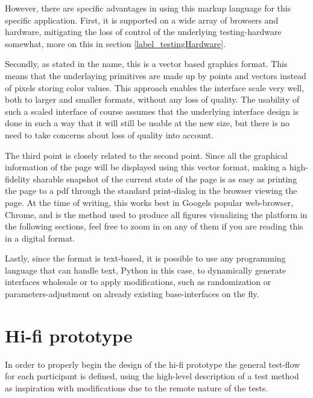 {  However, there are specific advantages in using this markup language for this
  specific application. First, it is supported on a wide array of browsers and
  hardware, mitigating the loss of control of the underlying testing-hardware
  somewhat, more on this in section \ref{label_testingHardware}.

  Secondly, as stated in the name, this is a vector based graphics format.
  This means that the underlaying primitives are made up by  points and vectors
  instead of pixels storing color values. This approach enables the interface
  scale very well, both to larger and smaller formats, without any loss of
  quality. The usability of such a scaled interface of course assumes that the
  underlying interface design is done in such a way that it will still be
  usable at the new size, but there is no need to take concerns about loss of
  quality into account.

  The third point is closely related to the second point. Since all the
  graphical information of the page will be displayed using this vector format,
  making a high-fidelity sharable snapshot of the current state of the page is
  as easy as printing the page to a pdf through the standard print-dialog in
  the browser viewing the page. At the time of writing, this works best
  in Googels popular web-browser, Chrome, and is the method used to produce all
  figures visualizing the platform in the following sections, feel free to zoom
  in on any of them if you are reading this in a digital format.

  Lastly, since the format is text-based, it is possible to use any programming
  language that can handle text, Python in this case, to dynamically generate
  interfaces wholesale or to apply modifications, such as randomization or
  parameters-adjustment on already existing base-interfaces on the fly.


\section{Hi-fi prototype}

  In order to properly begin the design of the hi-fi prototype the general
  test-flow for each participant is defined, using the high-level
  description of a test method\cite[p.78]{citeHandbookUsability} as
  inspiration with modifications due to the remote nature of the tests.


}
